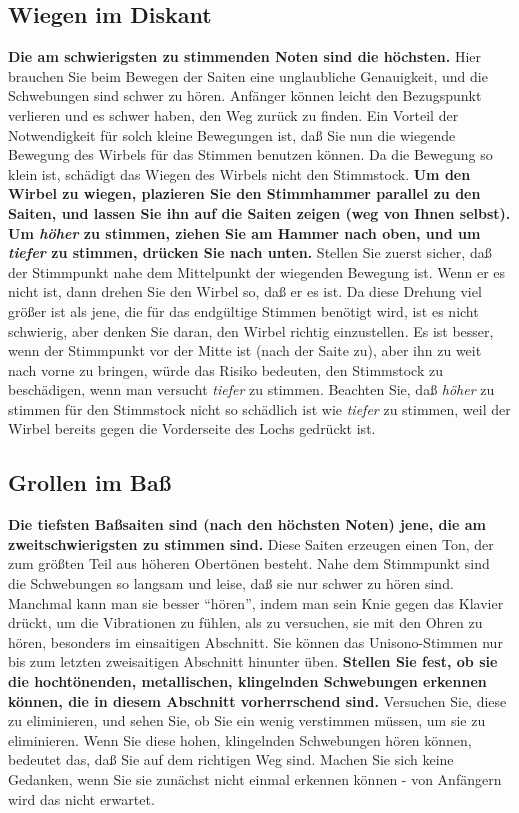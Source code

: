 \subsection{Wiegen im Diskant}

\textbf{Die am schwierigsten zu stimmenden Noten sind die höchsten.}
 Hier brauchen Sie beim Bewegen der Saiten eine unglaubliche Genauigkeit, und die Schwebungen sind schwer zu hören.
 Anfänger können leicht den Bezugspunkt verlieren und es schwer haben, den Weg zurück zu finden.
 Ein Vorteil der Notwendigkeit für solch kleine Bewegungen ist, daß Sie nun die wiegende Bewegung des Wirbels für das Stimmen benutzen können.
 Da die Bewegung so klein ist, schädigt das Wiegen des Wirbels nicht den Stimmstock.
 \textbf{Um den Wirbel zu wiegen, plazieren Sie den Stimmhammer parallel zu den Saiten, und lassen Sie ihn auf die Saiten zeigen (weg von Ihnen selbst).
 Um \textit{höher} zu stimmen, ziehen Sie am Hammer nach oben, und um \textit{tiefer} zu stimmen, drücken Sie nach unten.}
 Stellen Sie zuerst sicher, daß der Stimmpunkt nahe dem Mittelpunkt der wiegenden Bewegung ist.
 Wenn er es nicht ist, dann drehen Sie den Wirbel so, daß er es ist.
 Da diese Drehung viel größer ist als jene, die für das endgültige Stimmen benötigt wird, ist es nicht schwierig, aber denken Sie daran, den Wirbel richtig einzustellen.
 Es ist besser, wenn der Stimmpunkt vor der Mitte ist (nach der Saite zu), aber ihn zu weit nach vorne zu bringen, würde das Risiko bedeuten, den Stimmstock zu beschädigen, wenn man versucht \textit{tiefer} zu stimmen.
 Beachten Sie, daß \textit{höher} zu stimmen für den Stimmstock nicht so schädlich ist wie \textit{tiefer} zu stimmen, weil der Wirbel bereits gegen die Vorderseite des Lochs gedrückt ist.
 \hypertarget{c2_5i}{}\hypertarget{c2_5_bass}{}

\subsection{Grollen im Baß}

\textbf{Die tiefsten Baßsaiten sind (nach den höchsten Noten) jene, die am zweitschwierigsten zu stimmen sind.}
 Diese Saiten erzeugen einen Ton, der zum größten Teil aus höheren Obertönen besteht.
 Nahe dem Stimmpunkt sind die Schwebungen so langsam und leise, daß sie nur schwer zu hören sind.
 Manchmal kann man sie besser \enquote{hören}, indem man sein Knie gegen das Klavier drückt, um die Vibrationen zu fühlen, als zu versuchen, sie mit den Ohren zu hören, besonders im einsaitigen Abschnitt.
 Sie können das Unisono-Stimmen nur bis zum letzten zweisaitigen Abschnitt hinunter üben.
 \textbf{Stellen Sie fest, ob sie die hochtönenden, metallischen, klingelnden Schwebungen erkennen können, die in diesem Abschnitt vorherrschend sind.}
 Versuchen Sie, diese zu eliminieren, und sehen Sie, ob Sie ein wenig verstimmen müssen, um sie zu eliminieren.
 Wenn Sie diese hohen, klingelnden Schwebungen hören können, bedeutet das, daß Sie auf dem richtigen Weg sind.
 Machen Sie sich keine Gedanken, wenn Sie sie zunächst nicht einmal erkennen können - von Anfängern wird das nicht erwartet.
 \hypertarget{c2_5j}{}\hypertarget{c2_5_harm}{}

